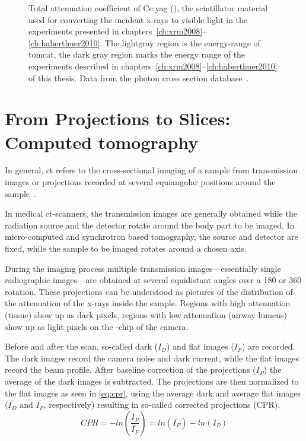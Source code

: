 \def\width{\linewidth}%
\def\height{0.618\linewidth}%
\begin{figure}[htb]%
	\noindent\makebox[\textwidth]{%
		\centering
		}
	\caption[Total attenuation coefficient of Ce:\acs{yag}]{Total attenuation coefficient of Ce:\acs{yag} (), the scintillator material used for converting the incident x-rays to visible light in the experiments presented in chapters~\ref{ch:xrm2008}--\ref{ch:haberthuer2010}. The lightgray region is the energy-range of \ac{tomcat}, the dark gray region marks the energy range of the experiments described in chapters~\autoref{ch:xrm2008}--\ref{ch:haberthuer2010} of this thesis. Data from the photon cross section database~\cite{XCOM}.}
	\label{fig:yag attenuation}
\end{figure}%

\section{From Projections to Slices: Computed tomography}
In general, \ac{ct} refers to the cross-sectional imaging of a sample from transmission images or projections recorded at several equiangular positions around the sample~\cite{Kak2002}.

In medical \ac{ct}-scanners, the transmission images are generally obtained while the radiation source and the detector rotate around the body part to be imaged. In micro-computed and synchrotron based tomography, the source and detector are fixed, while the sample to be imaged rotates around a chosen axis.

During the imaging process multiple transmission images---es\-sen\-tial\-ly single radiographic images---are obtained at several equidistant angles over a \unit{180}{\degree} or \unit{360}{\degree} rotation. These projections can be understood as pictures of the distribution of the attenuation of the x-rays inside the sample. Regions with high attenuation (\eg tissue) show up as dark pixels, regions with low attenuation (\eg airway lumens) show up as light pixels on the -chip of the camera.

Before and after the scan, so-called dark ($I_{D}$) and flat images ($I_{F}$) are recorded. The dark images record the camera noise and dark current, while the flat images record the beam profile. After baseline correction of the projections ($I_{P}$) the average of the dark images is subtracted. The projections are then normalized to the flat images as seen in \autoref{eq:cpr}, using the average dark and average flat images ($\overline{I_{D}}$ and $\overline{I_{F}}$, respectively) resulting in so-called corrected projections (CPR).%
\begin{equation}%
	CPR=-ln\left(\frac{I_{P}}{\overline{I_{F}}}\right)=ln(\overline{I_{F}})-ln(I_{P})%
	\label{eq:cpr}%
\end{equation}%

